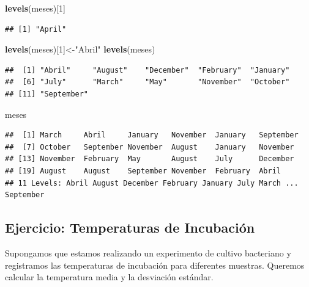 \documentclass[
]{book}
\newenvironment{Shaded}{\begin{snugshade}}{\end{snugshade}}
\newcommand{\DecValTok}[1]{\textcolor[rgb]{0.00,0.00,0.81}{#1}}
\newcommand{\FunctionTok}[1]{\textcolor[rgb]{0.13,0.29,0.53}{\textbf{#1}}}
\newcommand{\NormalTok}[1]{#1}
\newcommand{\OtherTok}[1]{\textcolor[rgb]{0.56,0.35,0.01}{#1}}
\newcommand{\StringTok}[1]{\textcolor[rgb]{0.31,0.60,0.02}{#1}}
\begin{document}
\begin{Shaded}
\begin{Highlighting}[]
\FunctionTok{levels}\NormalTok{(meses)[}\DecValTok{1}\NormalTok{]}
\end{Highlighting}
\end{Shaded}

\begin{verbatim}
## [1] "April"
\end{verbatim}

\begin{Shaded}
\begin{Highlighting}[]
\FunctionTok{levels}\NormalTok{(meses)[}\DecValTok{1}\NormalTok{]}\OtherTok{\textless{}{-}}\StringTok{"Abril"}
\FunctionTok{levels}\NormalTok{(meses)}
\end{Highlighting}
\end{Shaded}

\begin{verbatim}
##  [1] "Abril"     "August"    "December"  "February"  "January"  
##  [6] "July"      "March"     "May"       "November"  "October"  
## [11] "September"
\end{verbatim}

\begin{Shaded}
\begin{Highlighting}[]
\NormalTok{meses}
\end{Highlighting}
\end{Shaded}

\begin{verbatim}
##  [1] March     Abril     January   November  January   September
##  [7] October   September November  August    January   November 
## [13] November  February  May       August    July      December 
## [19] August    August    September November  February  Abril    
## 11 Levels: Abril August December February January July March ... September
\end{verbatim}

\subsection{Ejercicio: Temperaturas de Incubación}\label{ejercicio-temperaturas-de-incubaciuxf3n}

Supongamos que estamos realizando un experimento de cultivo bacteriano y registramos las temperaturas de incubación para diferentes muestras. Queremos calcular la temperatura media y la desviación estándar.
\end{document}

